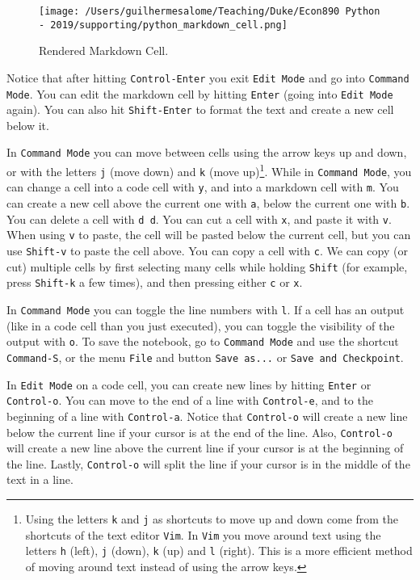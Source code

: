 \documentclass[12pt, a4paper]{article}
\begin{document}
\begin{figure}[htbp]
\centering
\texttt{[image: /Users/guilhermesalome/Teaching/Duke/Econ890 Python - 2019/supporting/python\_markdown\_cell.png]}
\caption{\label{fig:orgdf01b9d}
Rendered Markdown Cell.}
\end{figure}

Notice that after hitting \texttt{Control-Enter} you exit \texttt{Edit Mode} and go into \texttt{Command Mode}.
You can edit the markdown cell by hitting \texttt{Enter} (going into \texttt{Edit Mode} again).
You can also hit \texttt{Shift-Enter} to format the text and create a new cell below it.

In \texttt{Command Mode} you can move between cells using the arrow keys up and down, or with the letters \texttt{j} (move down) and \texttt{k} (move up)\footnote{Using the letters \texttt{k} and \texttt{j} as shortcuts to move up and down come from the shortcuts of the text editor \texttt{Vim}. In \texttt{Vim} you move around text using the letters \texttt{h} (left), \texttt{j} (down), \texttt{k} (up) and \texttt{l} (right). This is a more efficient method of moving around text instead of using the arrow keys.}.
While in \texttt{Command Mode}, you can change a cell into a code cell with \texttt{y}, and into a markdown cell with \texttt{m}.
You can create a new cell above the current one with \texttt{a}, below the current one with \texttt{b}.
You can delete a cell with \texttt{d d}.
You can cut a cell with \texttt{x}, and paste it with \texttt{v}.
When using \texttt{v} to paste, the cell will be pasted below the current cell, but you can use \texttt{Shift-v} to paste the cell above.
You can copy a cell with \texttt{c}.
We can copy (or cut) multiple cells by first selecting many cells while holding \texttt{Shift} (for example, press \texttt{Shift-k} a few times), and then pressing either \texttt{c} or \texttt{x}.

In \texttt{Command Mode} you can toggle the line numbers with \texttt{l}.
If a cell has an output (like in a code cell than you just executed), you can toggle the visibility of the output with \texttt{o}.
To save the notebook, go to \texttt{Command Mode} and use the shortcut \texttt{Command-S}, or the menu \texttt{File} and button \texttt{Save as...} or \texttt{Save and Checkpoint}.

In \texttt{Edit Mode} on a code cell, you can create new lines by hitting \texttt{Enter} or \texttt{Control-o}.
You can move to the end of a line with \texttt{Control-e}, and to the beginning of a line with \texttt{Control-a}.
Notice that \texttt{Control-o} will create a new line below the current line if your cursor is at the end of the line.
Also, \texttt{Control-o} will create a new line above the current line if your cursor is at the beginning of the line.
Lastly, \texttt{Control-o} will split the line if your cursor is in the middle of the text in a line.
\end{document}
